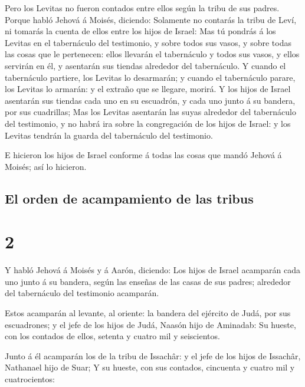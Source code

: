  Pero los Levitas no fueron contados entre ellos según la
tribu de sus padres.  Porque habló Jehová á Moisés,
diciendo:  Solamente no contarás la tribu de Leví, ni
tomarás la cuenta de ellos entre los hijos de Israel: 
Mas tú pondrás á los Levitas en el tabernáculo del testimonio, y sobre
todos sus vasos, y sobre todas las cosas que le pertenecen: ellos
llevarán el tabernáculo y todos sus vasos, y ellos servirán en él, y
asentarán sus tiendas alrededor del tabernáculo.  Y
cuando el tabernáculo partiere, los Levitas lo desarmarán; y cuando el
tabernáculo parare, los Levitas lo armarán: y el extraño que se llegare,
morirá.  Y los hijos de Israel asentarán sus tiendas cada
uno en su escuadrón, y cada uno junto á su bandera, por sus cuadrillas;
 Mas los Levitas asentarán las suyas alrededor del
tabernáculo del testimonio, y no habrá ira sobre la congregación de los
hijos de Israel: y los Levitas tendrán la guarda del tabernáculo del
testimonio.

 E hicieron los hijos de Israel conforme á todas las
cosas que mandó Jehová á Moisés; así lo hicieron.

\hypertarget{el-orden-de-acampamiento-de-las-tribus}{%
\subsection{El orden de acampamiento de las
tribus}\label{el-orden-de-acampamiento-de-las-tribus}}

\hypertarget{section-1}{%
\section{2}\label{section-1}}

 Y habló Jehová á Moisés y á Aarón, diciendo:
 Los hijos de Israel acamparán cada uno junto á su
bandera, según las enseñas de las casas de sus padres; alrededor del
tabernáculo del testimonio acamparán.

 Estos acamparán al levante, al oriente: la bandera del
ejército de Judá, por sus escuadrones; y el jefe de los hijos de Judá,
Naasón hijo de Aminadab:  Su hueste, con los contados de
ellos, setenta y cuatro mil y seiscientos.

 Junto á él acamparán los de la tribu de Issachâr: y el
jefe de los hijos de Issachâr, Nathanael hijo de Suar;  Y
su hueste, con sus contados, cincuenta y cuatro mil y cuatrocientos:

